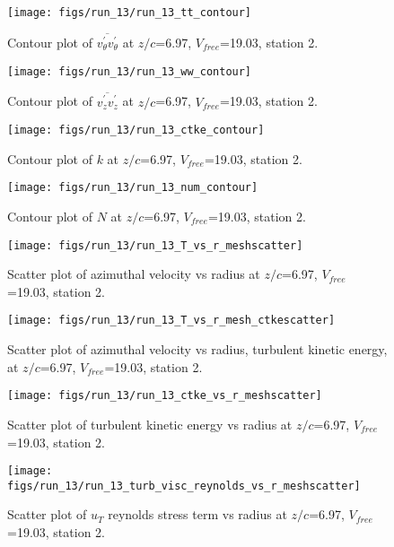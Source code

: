\begin{figure}[H]
\centering
\texttt{[image: figs/run\_13/run\_13\_tt\_contour]}
\caption{Contour plot of $\overline{v_{\theta}^{\prime} v_{\theta}^{\prime}}$ at $z/c$=6.97, $V_{free}$=19.03, station 2.}
\end{figure}


\begin{figure}[H]
\centering
\texttt{[image: figs/run\_13/run\_13\_ww\_contour]}
\caption{Contour plot of $\overline{v_{z}^{\prime} v_{z}^{\prime}}$ at $z/c$=6.97, $V_{free}$=19.03, station 2.}
\end{figure}


\begin{figure}[H]
\centering
\texttt{[image: figs/run\_13/run\_13\_ctke\_contour]}
\caption{Contour plot of $k$ at $z/c$=6.97, $V_{free}$=19.03, station 2.}
\end{figure}


\begin{figure}[H]
\centering
\texttt{[image: figs/run\_13/run\_13\_num\_contour]}
\caption{Contour plot of $N$ at $z/c$=6.97, $V_{free}$=19.03, station 2.}
\end{figure}


\begin{figure}[H]
\centering
\texttt{[image: figs/run\_13/run\_13\_T\_vs\_r\_meshscatter]}
\caption{Scatter plot of azimuthal velocity vs radius at $z/c$=6.97, $V_{free}$=19.03, station 2.}
\end{figure}


\begin{figure}[H]
\centering
\texttt{[image: figs/run\_13/run\_13\_T\_vs\_r\_mesh\_ctkescatter]}
\caption{Scatter plot of azimuthal velocity vs radius, turbulent kinetic energy, at $z/c$=6.97, $V_{free}$=19.03, station 2.}
\end{figure}


\begin{figure}[H]
\centering
\texttt{[image: figs/run\_13/run\_13\_ctke\_vs\_r\_meshscatter]}
\caption{Scatter plot of turbulent kinetic energy vs radius at $z/c$=6.97, $V_{free}$=19.03, station 2.}
\end{figure}


\begin{figure}[H]
\centering
\texttt{[image: figs/run\_13/run\_13\_turb\_visc\_reynolds\_vs\_r\_meshscatter]}
\caption{Scatter plot of $
u_T$ reynolds stress term vs radius at $z/c$=6.97, $V_{free}$=19.03, station 2.}
\end{figure}


